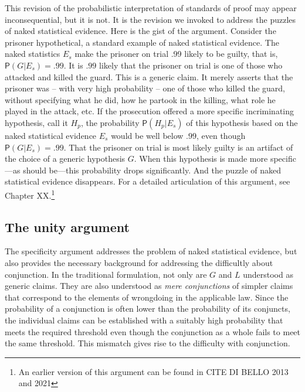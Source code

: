 \documentclass[
  10pt,
  dvipsnames,enabledeprecatedfontcommands]{scrartcl}
\newcommand{\pr}[1]{\ensuremath{\mathsf{P}(#1)}}
\begin{document}
This revision of the probabilistic interpretation of standards of proof
may appear inconsequential, but it is not. It is the revision we invoked
to address the puzzles of naked statistical evidence. Here is the gist
of the argument. Consider the prisoner hypothetical, a standard example
of naked statistical evidence. The naked statistics \(E_s\) make the
prisoner on trial .99 likely to be guilty, that is,
\(\pr{G \vert E_s} =.99\). It is \(.99\) likely that the prisoner on
trial is one of those who attacked and killed the guard. This is a
generic claim. It merely asserts that the prisoner was -- with very high
probability -- one of those who killed the guard, without specifying
what he did, how he partook in the killing, what role he played in the
attack, etc. If the prosecution offered a more specific incriminating
hypothesis, call it \(H_p\), the probability \(\pr{H_p \vert E_{s}}\) of
this hypothesis based on the naked statistical evidence \(E_s\) would be
well below \(.99\), even though \(\pr{G \vert E_s}=.99\). That the
prisoner on trial is most likely guilty is an artifact of the choice of
a generic hypothesis \(G\). When this hypothesis is made more
specific---as should be---this probability drops significantly. And the
puzzle of naked statistical evidence disappears. For a detailed
articulation of this argument, see Chapter XX.\footnote{An earlier
  version of this argument can be found in CITE DI BELLO 2013 and 2021}

\hypertarget{the-unity-argument}{%
\subsection{The unity argument}\label{the-unity-argument}}

The specificity argument addresses the problem of naked statistical
evidence, but also provides the necessary background for addressing the
difficultly about conjunction. In the traditional formulation, not only
are \(G\) and \(L\) understood as generic claims. They are also
understood as \emph{mere conjunctions} of simpler claims that correspond
to the elements of wrongdoing in the applicable law. Since the
probability of a conjunction is often lower than the probability of its
conjuncts, the individual claims can be established with a suitably high
probability that meets the required threshold even though the
conjunction as a whole fails to meet the same threshold. This mismatch
gives rise to the difficulty with conjunction.
\end{document}
